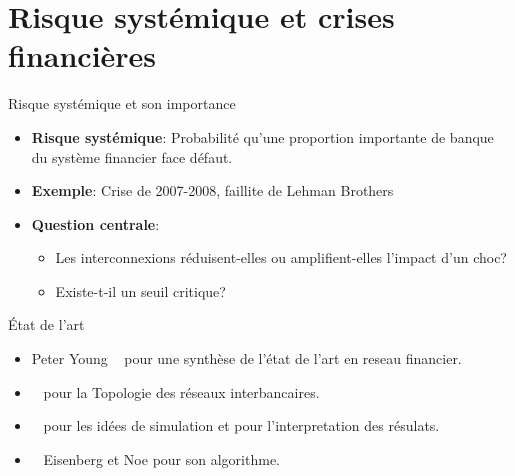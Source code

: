 \documentclass[aspectratio=169]{beamer}
\begin{document}
    \section{Risque systémique et crises financières}\label{sec:risque-systemique-et-crises-financieres}
    \begin{frame}{Risque systémique et son importance}
        \begin{itemize}
            \item \textbf{Risque systémique}: Probabilité qu'une proportion importante de banque du système financier face défaut.
            \vspace{0.3cm}
            \item \textbf{Exemple}: Crise de 2007-2008, faillite de Lehman Brothers
            \vspace{0.3cm}
            \item \textbf{Question centrale}:
            \begin{itemize}
                \item Les interconnexions réduisent-elles ou amplifient-elles l'impact d'un choc?
                \item Existe-t-il un seuil critique?
            \end{itemize}
        \end{itemize}

    \end{frame}

    \begin{frame}{État de l'art}
        \begin{itemize}
            \item Peter Young ~\cite{peyton2016contagion} pour une synthèse de l'état de l'art en reseau financier.
            \item ~\cite{jglass2006topologyus} pour la Topologie des réseaux interbancaires.
            \item ~\cite{nier2008stability} pour les idées de simulation et pour l'interpretation des résulats.
            \item ~\cite{eisenberg2001systemic} Eisenberg et Noe pour son algorithme.
        \end{itemize}
    \end{frame}

\end{document}
